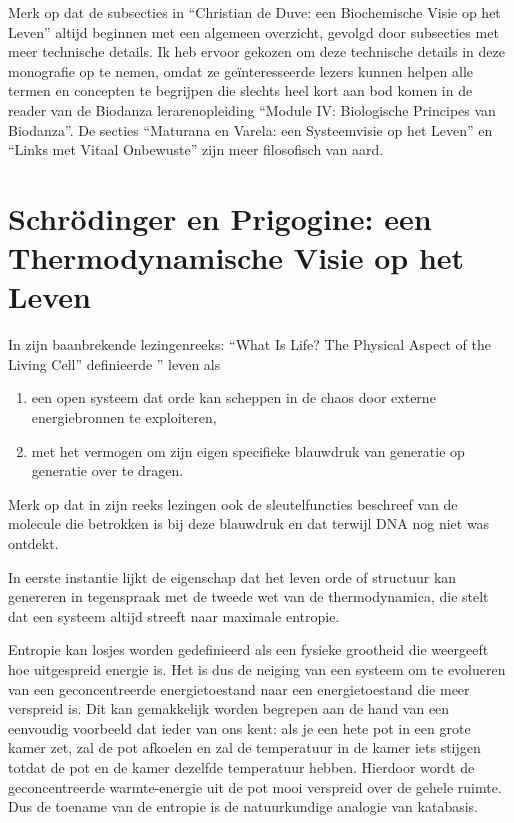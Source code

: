 \documentclass[
  11pt,
]{book}
\begin{document}
Merk op dat de subsecties in ``Christian de Duve: een Biochemische Visie op het Leven'' altijd beginnen met een algemeen overzicht, gevolgd door subsecties met meer technische details. Ik heb ervoor gekozen om deze technische details in deze monografie op te nemen, omdat ze geïnteresseerde lezers kunnen helpen alle termen en concepten te begrijpen die slechts heel kort aan bod komen in de reader van de Biodanza lerarenopleiding ``Module IV: Biologische Principes van Biodanza''. De secties ``Maturana en Varela: een Systeemvisie op het Leven'' en ``Links met Vitaal Onbewuste'' zijn meer filosofisch van aard.

\newpage

\hypertarget{schruxf6dinger-en-prigogine-een-thermodynamische-visie-op-het-leven}{%
\section{Schrödinger en Prigogine: een Thermodynamische Visie op het Leven}\label{schruxf6dinger-en-prigogine-een-thermodynamische-visie-op-het-leven}}

In zijn baanbrekende lezingenreeks: ``What Is Life? The Physical Aspect of the Living Cell'' definieerde '' \citet{schrodinger1944} leven als

\begin{enumerate}
\def\labelenumi{\arabic{enumi}.}
\item
  een open systeem dat orde kan scheppen in de chaos door externe energiebronnen te exploiteren,
\item
  met het vermogen om zijn eigen specifieke blauwdruk van generatie op generatie over te dragen.
\end{enumerate}

Merk op dat \citet{schrodinger1944} in zijn reeks lezingen ook de sleutelfuncties beschreef van de molecule die betrokken is bij deze blauwdruk en dat terwijl DNA nog niet was ontdekt.

In eerste instantie lijkt de eigenschap dat het leven orde of structuur kan genereren in tegenspraak met de tweede wet van de thermodynamica, die stelt dat een systeem altijd streeft naar maximale entropie.

Entropie kan losjes worden gedefinieerd als een fysieke grootheid die weergeeft hoe uitgespreid energie is. Het is dus de neiging van een systeem om te evolueren van een geconcentreerde energietoestand naar een energietoestand die meer verspreid is. Dit kan gemakkelijk worden begrepen aan de hand van een eenvoudig voorbeeld dat ieder van ons kent: als je een hete pot in een grote kamer zet, zal de pot afkoelen en zal de temperatuur in de kamer iets stijgen totdat de pot en de kamer dezelfde temperatuur hebben. Hierdoor wordt de geconcentreerde warmte-energie uit de pot mooi verspreid over de gehele ruimte. Dus de toename van de entropie is de natuurkundige analogie van katabasis.
\end{document}
